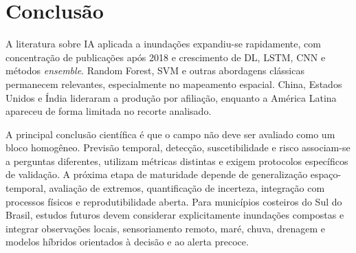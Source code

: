 \section{Conclusão}
\label{sec:art-conclusao}

A literatura sobre IA aplicada a inundações expandiu-se rapidamente, com concentração de publicações após 2018 e crescimento de DL, LSTM, CNN e métodos \textit{ensemble}. Random Forest, SVM e outras abordagens clássicas permanecem relevantes, especialmente no mapeamento espacial. China, Estados Unidos e Índia lideraram a produção por afiliação, enquanto a América Latina apareceu de forma limitada no recorte analisado.

A principal conclusão científica é que o campo não deve ser avaliado como um bloco homogêneo. Previsão temporal, detecção, suscetibilidade e risco associam-se a perguntas diferentes, utilizam métricas distintas e exigem protocolos específicos de validação. A próxima etapa de maturidade depende de generalização espaço-temporal, avaliação de extremos, quantificação de incerteza, integração com processos físicos e reprodutibilidade aberta. Para municípios costeiros do Sul do Brasil, estudos futuros devem considerar explicitamente inundações compostas e integrar observações locais, sensoriamento remoto, maré, chuva, drenagem e modelos híbridos orientados à decisão e ao alerta precoce.